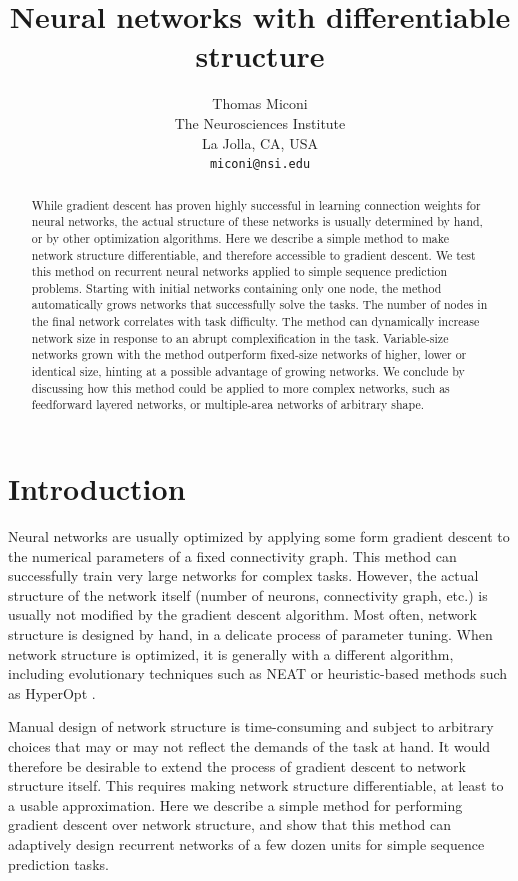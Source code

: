 \documentclass{article}
\title{Neural networks with differentiable structure}
\author{
Thomas Miconi\\%
  The Neurosciences Institute\\
 La Jolla, CA, USA \\
  \texttt{miconi@nsi.edu} \\
}
\begin{document}
 
\maketitle

\begin{abstract}

While gradient descent has proven highly successful in learning connection
weights for neural networks, the actual structure of these networks is usually determined by hand, or by
other optimization algorithms.  Here we describe a simple method to make
network structure differentiable, and therefore accessible to gradient descent.
We test this method on recurrent neural networks applied to simple
sequence prediction problems. Starting with initial networks containing only
one node, the method automatically grows networks that successfully solve the
tasks. The number of nodes in the final network correlates with task
difficulty. The method can dynamically increase network size in response to an
abrupt complexification in the task.
Variable-size networks grown with the method outperform fixed-size
networks of higher, lower or identical size, hinting at a possible advantage of growing networks. We conclude by discussing how this
method could be applied to more complex networks, such as feedforward layered
networks, or multiple-area networks of arbitrary shape.

\end{abstract}

\section{Introduction}

Neural networks are usually optimized by applying some form gradient descent to
the numerical parameters of a fixed connectivity graph. This method can
successfully train very large networks for complex tasks. However, the actual
structure of the network itself (number of neurons, connectivity graph, etc.) is usually not modified by the gradient
descent algorithm. Most often, network structure is designed by hand, in a delicate process of parameter tuning.
When network structure is optimized, it is generally with a different
algorithm, including evolutionary techniques such as NEAT \cite{Stanley2002-ug} or heuristic-based methods such as HyperOpt \cite{Yamins2014-us}.

Manual design of network structure is time-consuming and subject to arbitrary
choices that may or may not reflect the demands of the task at hand. It would
therefore be desirable to extend the process of gradient descent to network
structure itself. This requires making network structure differentiable, at
least to a usable approximation. Here we describe a simple method
for performing gradient descent over network structure, and show that this
method can adaptively design recurrent networks of a few dozen units for simple
sequence prediction
tasks.
\end{document}
